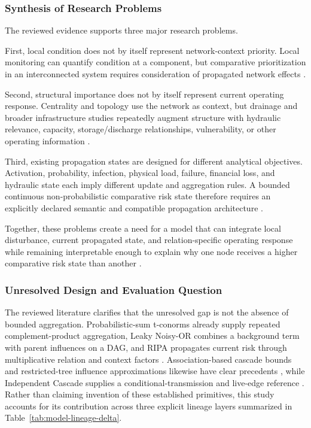 \subsubsection{Synthesis of Research
Problems}\label{synthesis-of-research-problems}

The reviewed evidence supports three major research problems.

First, local condition does not by itself represent network-context
priority. Local monitoring can quantify condition at a component, but
comparative prioritization in an interconnected system requires
consideration of propagated network effects
\citep{iqbal2021,vandaele2024,simone2022,dastgir2023}.

Second, structural importance does not by itself represent current
operating response. Centrality and topology use the network as context,
but drainage and broader infrastructure studies repeatedly augment
structure with hydraulic relevance, capacity, storage/discharge
relationships, vulnerability, or other operating information
\citep{simone2022,dastgir2023,meijer2023,buldyrev2010,faraji2026}.

Third, existing propagation states are designed for different analytical
objectives. Activation, probability, infection, physical load, failure,
financial loss, and hydraulic state each imply different update and
aggregation rules. A bounded continuous non-probabilistic comparative
risk state therefore requires an explicitly declared semantic and
compatible propagation architecture \citep{kempe2003,kermack1927,
sheyner2002,buldyrev2010,faraji2026,zhang2024}.

Together, these problems create a need for a model that can integrate
local disturbance, current propagated state, and relation-specific
operating response while remaining interpretable enough to explain why
one node receives a higher comparative risk state than another
\citep{simone2022,dastgir2023,meijer2023,zhang2024}.

\subsubsection{Unresolved Design and Evaluation Question}
\label{architectural-and-integrative-research-gap}

The reviewed literature clarifies that the unresolved gap is not the
absence of bounded aggregation. Probabilistic-sum t-conorms already
supply repeated complement-product aggregation, Leaky Noisy-OR combines a
background term with parent influences on a DAG, and RIPA propagates
current risk through multiplicative relation and context factors
\citep{klement2004,fallet2012,faraji2026}. Association-based cascade
bounds and restricted-tree influence approximations likewise have clear
precedents \citep{abbe2017,abbe2020,chen2010mia,chen2010ldag}, while
Independent Cascade supplies a conditional-transmission and live-edge
reference \citep{kempe2003}. Rather than claiming invention of these
established primitives, this study accounts for its contribution across
three explicit lineage layers summarized in
Table~\ref{tab:model-lineage-delta}.

